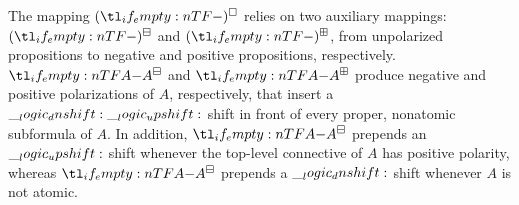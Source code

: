 The mapping $\embed*{}$ relies on two auxiliary mappings:
$\embedn*{}$ and $\embedp*{}$, from unpolarized propositions to negative and positive propositions, respectively.
$\embedn{A}$ and $\embedp{A}$ produce negative and positive polarizations of $A$, respectively, that insert a $\__logic_dnshift: \__logic_upshift:$ shift in front of every proper, nonatomic subformula of $A$.
In addition, $\embedn{A}$ prepends an $\__logic_upshift:$ shift whenever the top-level connective of $A$ has positive polarity, whereas $\embedn{A}$ prepends a $\__logic_dnshift:$ shift whenever $A$ is not atomic.
%
